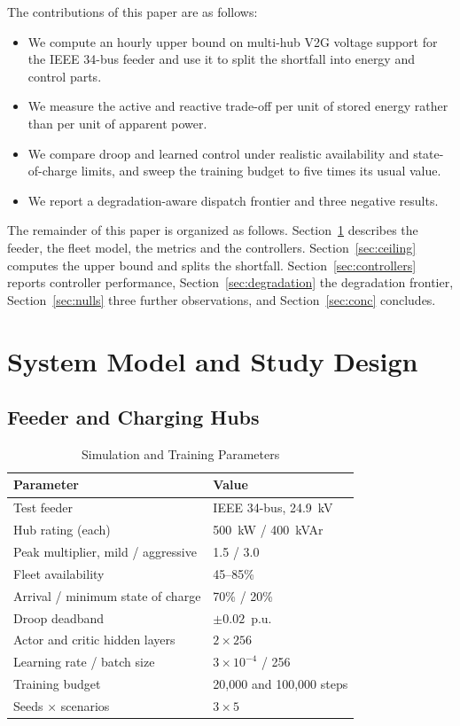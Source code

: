 \documentclass[conference,a4paper]{IEEEtran}
\begin{document}
The contributions of this paper are as follows:
\begin{itemize}
\item We compute an hourly upper bound on multi-hub V2G voltage support for the IEEE 34-bus
feeder and use it to split the shortfall into energy and control parts.
\item We measure the active and reactive trade-off per unit of stored energy rather than
per unit of apparent power.
\item We compare droop and learned control under realistic availability and
state-of-charge limits, and sweep the training budget to five times its usual value.
\item We report a degradation-aware dispatch frontier and three negative results.
\end{itemize}

The remainder of this paper is organized as follows. Section~\ref{sec:design} describes the
feeder, the fleet model, the metrics and the controllers. Section~\ref{sec:ceiling} computes
the upper bound and splits the shortfall. Section~\ref{sec:controllers} reports controller
performance, Section~\ref{sec:degradation} the degradation frontier,
Section~\ref{sec:nulls} three further observations, and Section~\ref{sec:conc} concludes.

\section{System Model and Study Design}
\label{sec:design}

\subsection{Feeder and Charging Hubs}

\begin{table}[b]
\caption{Simulation and Training Parameters}
\label{tab:params}
\centering
\begin{tabular}{ll}
\toprule
Parameter & Value \\
\midrule
Test feeder & IEEE 34-bus, 24.9~kV \\
Hub rating (each) & 500~kW / 400~kVAr \\
Peak multiplier, mild / aggressive & 1.5 / 3.0 \\
Fleet availability & 45--85\% \\
Arrival / minimum state of charge & 70\% / 20\% \\
Droop deadband & $\pm0.02$~p.u. \\
Actor and critic hidden layers & $2\times256$ \\
Learning rate / batch size & $3\times10^{-4}$ / 256 \\
Training budget & 20{,}000 and 100{,}000 steps \\
Seeds $\times$ scenarios & $3\times5$ \\
\bottomrule
\end{tabular}
\end{table}
\end{document}

